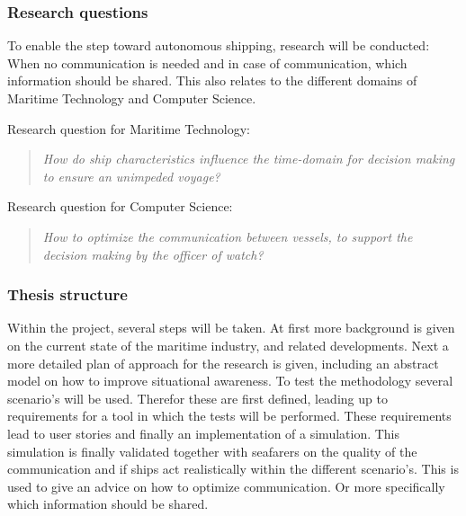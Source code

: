 \subsubsection*{Research questions}
To enable the step toward autonomous shipping, research will be conducted: When no communication is needed and in case of communication, which information should be shared. This also relates to the different domains of Maritime Technology and Computer Science.

Research question for Maritime Technology:
\begin{quotation}
	\emph{How do ship characteristics influence the time-domain for decision making to ensure an unimpeded voyage?} 
\end{quotation}

Research question for Computer Science:
\begin{quotation}
	\emph{How to optimize the communication between vessels, to support the decision making by the officer of watch?}
\end{quotation}


\subsubsection*{Thesis structure}
Within the project, several steps will be taken. At first more background is given on the current state of the maritime industry, and related developments. 
Next a more detailed plan of approach for the research is given, including an abstract model on how to improve situational awareness. To test the methodology several scenario's will be used. Therefor these are first defined, leading up to requirements for a tool in which the tests will be performed.
These requirements lead to user stories and finally an implementation of a simulation.
This simulation is finally validated together with seafarers on the quality of the communication and if ships act realistically within the different scenario's. This is used to give an advice on how to optimize communication. Or more specifically which information should be shared.
